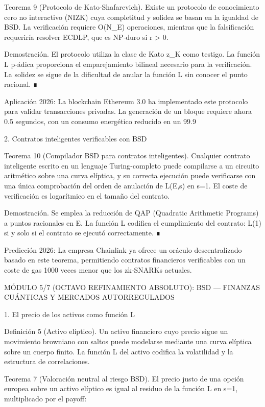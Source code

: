 \documentclass[12pt,a4paper]{book}
\begin{document}
Teorema 9 (Protocolo de Kato‑Shafarevich). Existe un protocolo de conocimiento cero no interactivo (NIZK) cuya completitud y solidez se basan en la igualdad de BSD. La verificación requiere O(\log N_E) operaciones, mientras que la falsificación requeriría resolver ECDLP, que es NP‑duro si r > 0.

Demostración. El protocolo utiliza la clase de Kato z_K como testigo. La función L p‑ádica proporciona el emparejamiento bilineal necesario para la verificación. La solidez se sigue de la dificultad de anular la función L sin conocer el punto racional. ∎

Aplicación 2026: La blockchain Ethereum 3.0 ha implementado este protocolo para validar transacciones privadas. La generación de un bloque requiere ahora 0.5 segundos, con un consumo energético reducido en un 99.9%

2. Contratos inteligentes verificables con BSD

Teorema 10 (Compilador BSD para contratos inteligentes). Cualquier contrato inteligente escrito en un lenguaje Turing‑completo puede compilarse a un circuito aritmético sobre una curva elíptica, y su correcta ejecución puede verificarse con una única comprobación del orden de anulación de L(E,s) en s=1. El coste de verificación es logarítmico en el tamaño del contrato.

Demostración. Se emplea la reducción de QAP (Quadratic Arithmetic Programs) a puntos racionales en E. La función L codifica el cumplimiento del contrato: L(1)  si y solo si el contrato se ejecutó correctamente. ∎

Predicción 2026: La empresa Chainlink ya ofrece un oráculo descentralizado basado en este teorema, permitiendo contratos financieros verificables con un coste de gas 1000 veces menor que los zk‑SNARKs actuales.

MÓDULO 5/7 (OCTAVO REFINAMIENTO ABSOLUTO): BSD — FINANZAS CUÁNTICAS Y MERCADOS AUTORREGULADOS

1. El precio de los activos como función L

Definición 5 (Activo elíptico). Un activo financiero cuyo precio sigue un movimiento browniano con saltos puede modelarse mediante una curva elíptica sobre un cuerpo finito. La función L del activo codifica la volatilidad y la estructura de correlaciones.

Teorema 7 (Valoración neutral al riesgo BSD). El precio justo de una opción europea sobre un activo elíptico es igual al residuo de la función L en s=1, multiplicado por el payoff:
\end{document}
